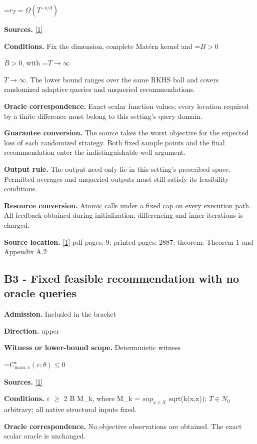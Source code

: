 \documentclass[10pt,a4paper]{article}
\newcommand{\AtlasMath}[1]{\par\begingroup\centering\setbox0=\hbox{$\displaystyle #1$}\ifdim\wd0>1.4\linewidth\typeout{ATLAS WIDE FORMULA: \the\wd0}\fi\ifdim\wd0>\linewidth\resizebox{\linewidth}{!}{\box0}\else\box0\fi\par\endgroup}
\newcommand{\AtlasInlineMath}[1]{\begingroup\setbox0=\hbox{$#1$}\ifdim\wd0>.4\linewidth\endgroup\AtlasMath{#1}\else\endgroup$#1$\fi}
\begin{document}
\AtlasMath{r_T=\Omega(T^{-\nu/d})}
\textbf{Sources.} \href{https://www.jmlr.org/papers/volume12/bull11a/bull11a.pdf}{[1]}

\textbf{Conditions.} Fix the dimension, complete Matérn kernel and \AtlasInlineMath{B>0}, with \AtlasInlineMath{T\to\infty}. The lower bound ranges over the same RKHS ball and covers randomized adaptive queries and unqueried recommendations.

\textbf{Oracle correspondence.} Exact scalar function values; every location required by a finite difference must belong to this setting's query domain.

\textbf{Guarantee conversion.} The source takes the worst objective for the expected loss of each randomized strategy. Both fixed sample points and the final recommendation enter the indistinguishable-well argument.

\textbf{Output rule.} The output need only lie in this setting's prescribed space. Permitted averages and unqueried outputs must still satisfy its feasibility conditions.

\textbf{Resource conversion.} Atomic calls under a fixed cap on every execution path. All feedback obtained during initialization, differencing and inner iterations is charged.

\textbf{Source location.} \href{https://www.jmlr.org/papers/volume12/bull11a/bull11a.pdf}{[1]} pdf pages: 9; printed pages: 2887; theorem: Theorem 1 and Appendix A.2

\subsection{B3 - Fixed feasible recommendation with no oracle queries}
\textbf{Admission.} Included in the bracket

\textbf{Direction.} upper

\textbf{Witness or lower-bound scope.} Deterministic witness

\AtlasMath{C^\star_{\mathrm{main},\pi}(\varepsilon;\theta)\le 0}
\textbf{Sources.} \href{https://www.jmlr.org/papers/volume12/bull11a/bull11a.pdf}{[1]}

\textbf{Conditions.} $\varepsilon$ $\ge$ 2 B M\_\allowbreak{}k, where M\_\allowbreak{}k = $sup_{x\in X}$ sqrt(k(x,x)); $T\in N_0$ arbitrary; all native structural inputs fixed.

\textbf{Oracle correspondence.} No objective observations are obtained. The exact scalar oracle is unchanged.
\end{document}
